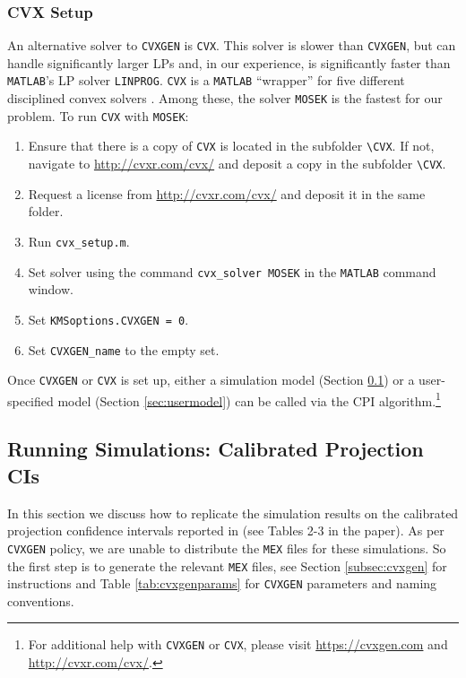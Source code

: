 \documentclass[12pt]{article}
\def\code#1{\texttt{#1}}
\begin{document}
\subsubsection{CVX Setup}
An alternative solver to \code{CVXGEN} is \code{CVX}.  This solver is slower than \code{CVXGEN}, but can handle significantly larger LPs and, in our experience, is significantly faster than \code{MATLAB}'s LP solver \code{LINPROG}.  \code{CVX} is a \code{MATLAB} ``wrapper'' for five different disciplined convex solvers \cite{cvx,gb08}.  Among these, the solver \code{MOSEK} is the fastest for our problem.  To run \code{CVX} with \code{MOSEK}:
\begin{enumerate}
\item Ensure that there is a copy of \code{CVX} is located in the subfolder \code{\textbackslash CVX}.  If not, navigate to \url{http://cvxr.com/cvx/} and deposit a copy in the subfolder \code{\textbackslash CVX}.
\item Request a license from  \url{http://cvxr.com/cvx/} and deposit it in the same folder.
\item Run \code{cvx\_setup.m}.
\item Set solver using the command \code{cvx\_solver MOSEK} in the \code{MATLAB} command window.
\item Set \code{KMSoptions.CVXGEN = 0}.
\item Set  \code{CVXGEN\_name} to the empty set.
\end{enumerate}
Once \code{CVXGEN} or \code{CVX} is set up, either a simulation model (Section \ref{sec:simulations}) or a user-specified model (Section \ref{sec:usermodel}) can be called via the CPI algorithm.\footnote{For additional help with \code{CVXGEN} or \code{CVX}, please visit   \url{https://cvxgen.com} and \url{http://cvxr.com/cvx/}.}

\subsection{Running Simulations: Calibrated Projection CIs}\label{sec:simulations}
In this section we discuss how to replicate the simulation results on the calibrated projection confidence intervals reported  in  (see Tables 2-3 in the paper).  As per \code{CVXGEN} policy, we are unable to distribute the \code{MEX} files for these simulations.  So the first step is to generate the relevant \code{MEX} files, see Section \ref{subsec:cvxgen} for instructions and Table \ref{tab:cvxgenparams} for \code{CVXGEN} parameters and naming conventions.
\end{document}
